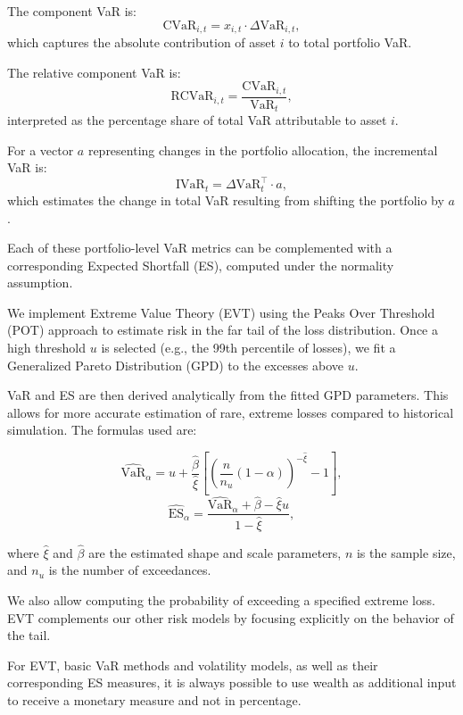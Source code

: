 \documentclass[12pt]{article}
\begin{document}
The component VaR is:
\[
  \text{CVaR}_{i,t} = x_{i,t} \cdot \Delta \text{VaR}_{i,t},
\]
which captures the absolute contribution of asset $i$ to total portfolio VaR.

The relative component VaR is:
\[
  \text{RCVaR}_{i,t} = \frac{\text{CVaR}_{i,t}}{\text{VaR}_t},
\]
interpreted as the percentage share of total VaR attributable to asset $i$.

For a vector $a$ representing changes in the portfolio allocation, the incremental VaR is:
\[
  \text{IVaR}_t = \Delta \text{VaR}_t^\top \cdot a,
\]
which estimates the change in total VaR resulting from shifting the portfolio by $a$.

Each of these portfolio-level VaR metrics can be complemented with a corresponding Expected Shortfall (ES), computed under the normality assumption.


\vspace{1em}
\underline{}

\vspace{0.6em}

We implement Extreme Value Theory (EVT) using the Peaks Over Threshold (POT) approach to estimate risk in the far tail of the loss distribution. Once a high threshold $u$ is selected (e.g., the 99th percentile of losses), we fit a Generalized Pareto Distribution (GPD) to the excesses above $u$.

VaR and ES are then derived analytically from the fitted GPD parameters. This allows for more accurate estimation of rare, extreme losses compared to historical simulation. The formulas used are:

\[
\widehat{\text{VaR}}_\alpha = u + \frac{\hat{\beta}}{\hat{\xi}} \left[ \left( \frac{n}{n_u}(1 - \alpha) \right)^{-\hat{\xi}} - 1 \right],
\]
\[
\widehat{\text{ES}}_\alpha = \frac{\widehat{\text{VaR}}_\alpha + \hat{\beta} - \hat{\xi} u}{1 - \hat{\xi}},
\]

where $\hat{\xi}$ and $\hat{\beta}$ are the estimated shape and scale parameters, $n$ is the sample size, and $n_u$ is the number of exceedances.

We also allow computing the probability of exceeding a specified extreme loss. EVT complements our other risk models by focusing explicitly on the behavior of the tail.

For EVT, basic VaR methods and volatility models, as well as their corresponding ES measures, it is always possible to use wealth as additional input to receive a monetary measure and not in percentage.
\end{document}
